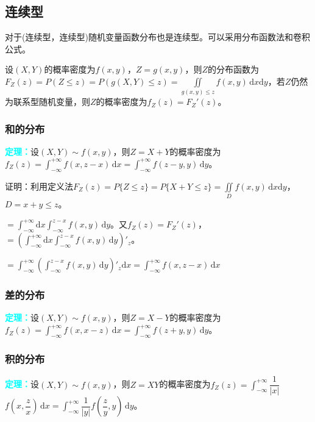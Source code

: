\documentclass[UTF8, 12pt]{ctexart}
\begin{document}
\subsection{连续型}

对于(连续型，连续型)随机变量函数分布也是连续型。可以采用分布函数法和卷积公式。

设$(X,Y)$的概率密度为$f(x,y)$，$Z=g(x,y)$，则$Z$的分布函数为$F_Z(z)=P(Z\leqslant z)=P(g(X,Y)\leqslant z)=\iint\limits_{g(x,y)\leqslant z}f(x,y)\,\textrm{d}x\textrm{d}y$，若$Z$仍然为联系型随机变量，则$Z$的概率密度为$f_Z(z)=F_Z'(z)$。

\subsubsection{和的分布}

\textcolor{aqua}{\textbf{定理：}}设$(X,Y)\sim f(x,y)$，则$Z=X+Y$的概率密度为$f_Z(z)=\int_{-\infty}^{+\infty}f(x,z-x)\,\textrm{d}x=\int_{-\infty}^{+\infty}f(z-y,y)\,\textrm{d}y$。

证明：利用定义法$F_Z(z)=P\{Z\leqslant z\}=P\{X+Y\leqslant z\}=\iint\limits_Df(x,y)\,\textrm{d}x\textrm{d}y$，$D=x+y\leqslant z$。

$=\int_{-\infty}^{+\infty}\textrm{d}x\int_{-\infty}^{z-x}f(x,y)\,\textrm{d}y$。又$f_Z(z)=F_Z'(z)$，$=(\int_{-\infty}^{+\infty}\textrm{d}x\int_{-\infty}^{z-x}f(x,y)\,\textrm{d}y)'_z$。

$=\int_{-\infty}^{+\infty}(\int_{-\infty}^{z-x}f(x,y)\,\textrm{d}y)'_z\textrm{d}x=\int_{-\infty}^{+\infty}f(x,z-x)\,\textrm{d}x$

\subsubsection{差的分布}

\textcolor{aqua}{\textbf{定理：}}设$(X,Y)\sim f(x,y)$，则$Z=X-Y$的概率密度为$f_Z(z)=\int_{-\infty}^{+\infty}f(x,x-z)\,\textrm{d}x=\int_{-\infty}^{+\infty}f(z+y,y)\,\textrm{d}y$。

\subsubsection{积的分布}

\textcolor{aqua}{\textbf{定理：}}设$(X,Y)\sim f(x,y)$，则$Z=XY$的概率密度为$f_Z(z)=\displaystyle{\int_{-\infty}^{+\infty}}\dfrac{1}{\vert x\vert}$\\$f\left(x,\dfrac{z}{x}\right)\,\textrm{d}x=\displaystyle{\int_{-\infty}^{+\infty}}\dfrac{1}{\vert y\vert}f\left(\dfrac{z}{y},y\right)\,\textrm{d}y$。
\end{document}
